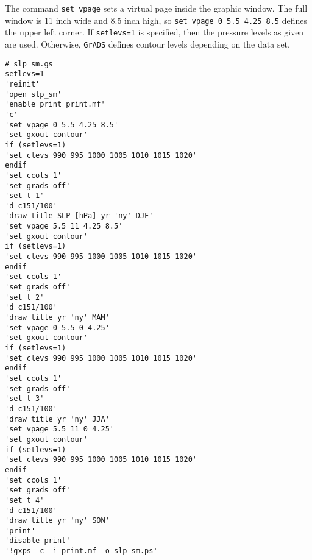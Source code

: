 The command \verb/set vpage/ sets a virtual page inside the graphic 
window. The full window is 11 inch wide and 8.5 inch high, so 
\verb/set vpage 0 5.5 4.25 8.5/ defines the upper left corner. 
If \verb/setlevs=1/ is specified, then the pressure levels as given are used. 
Otherwise, \verb/GrADS/ defines contour levels depending on the data set.

\begin{verbatim}
# slp_sm.gs
setlevs=1
'reinit'
'open slp_sm'
'enable print print.mf'
'c'
'set vpage 0 5.5 4.25 8.5'
'set gxout contour'
if (setlevs=1)
'set clevs 990 995 1000 1005 1010 1015 1020'
endif
'set ccols 1'
'set grads off'
'set t 1'
'd c151/100'
'draw title SLP [hPa] yr 'ny' DJF'
'set vpage 5.5 11 4.25 8.5'
'set gxout contour'
if (setlevs=1)
'set clevs 990 995 1000 1005 1010 1015 1020'
endif
'set ccols 1'
'set grads off'
'set t 2'
'd c151/100'
'draw title yr 'ny' MAM'
'set vpage 0 5.5 0 4.25'
'set gxout contour'
if (setlevs=1)
'set clevs 990 995 1000 1005 1010 1015 1020'
endif
'set ccols 1'
'set grads off'
'set t 3'
'd c151/100'
'draw title yr 'ny' JJA'
'set vpage 5.5 11 0 4.25'
'set gxout contour'
if (setlevs=1)
'set clevs 990 995 1000 1005 1010 1015 1020'
endif
'set ccols 1'
'set grads off'
'set t 4'
'd c151/100'
'draw title yr 'ny' SON'
'print'
'disable print'
'!gxps -c -i print.mf -o slp_sm.ps'
\end{verbatim}
